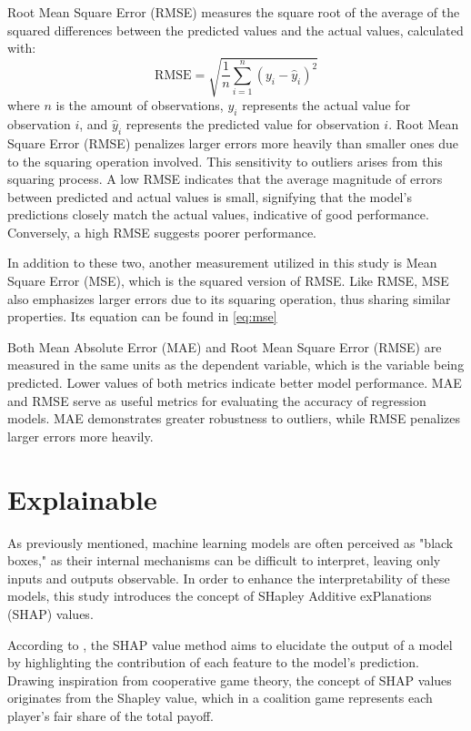 \documentclass[12pt,a4paper,english
]{tunithesis}
\begin{document}
Root Mean Square Error (RMSE) measures the square root of the average of the squared differences between the predicted values and the actual values, calculated with: 
\begin{equation}
    \mathrm{RMSE}=\sqrt{\frac{1}{n} \sum_{i=1}^n\left(y_i-\hat{y}_i\right)^2}
\end{equation}
where $n$ is the amount of observations, $y_i$ represents the actual value for observation $i$, and $\hat{y}_i$ represents the predicted value for observation $i$. Root Mean Square Error (RMSE) penalizes larger errors more heavily than smaller ones due to the squaring operation involved. This sensitivity to outliers arises from this squaring process. A low RMSE indicates that the average magnitude of errors between predicted and actual values is small, signifying that the model's predictions closely match the actual values, indicative of good performance. Conversely, a high RMSE suggests poorer performance.

In addition to these two, another measurement utilized in this study is Mean Square Error (MSE), which is the squared version of RMSE. Like RMSE, MSE also emphasizes larger errors due to its squaring operation, thus sharing similar properties. Its equation can be found in \ref{eq:mse}

Both Mean Absolute Error (MAE) and Root Mean Square Error (RMSE) are measured in the same units as the dependent variable, which is the variable being predicted. Lower values of both metrics indicate better model performance. MAE and RMSE serve as useful metrics for evaluating the accuracy of regression models. MAE demonstrates greater robustness to outliers, while RMSE penalizes larger errors more heavily. 

\section{Explainable}
As previously mentioned, machine learning models are often perceived as "black boxes," as their internal mechanisms can be difficult to interpret, leaving only inputs and outputs observable. In order to enhance the interpretability of these models, this study introduces the concept of SHapley Additive exPlanations (SHAP) values.  

According to \textcite{lundberg2017, camilla_shap}, the SHAP value method aims to elucidate the output of a model by highlighting the contribution of each feature to the model's prediction. Drawing inspiration from cooperative game theory, the concept of SHAP values originates from the Shapley value, which in a coalition game represents each player's fair share of the total payoff.
\end{document}
